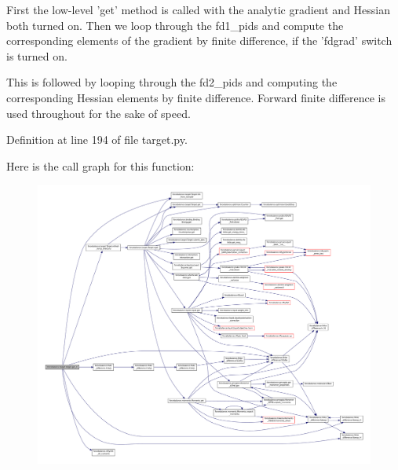 \-First the low-\/level 'get' method is called with the analytic gradient and \-Hessian both turned on. \-Then we loop through the fd1\-\_\-pids and compute the corresponding elements of the gradient by finite difference, if the 'fdgrad' switch is turned on.

\-This is followed by looping through the fd2\-\_\-pids and computing the corresponding \-Hessian elements by finite difference. \-Forward finite difference is used throughout for the sake of speed. 

\-Definition at line 194 of file target.\-py.



\-Here is the call graph for this function\-:\nopagebreak
\begin{figure}[H]
\begin{center}
\leavevmode
\includegraphics[width=350pt]{classforcebalance_1_1target_1_1Target_a1d2ee27fe86a09769c1816af23b09adb_cgraph}
\end{center}
\end{figure}


